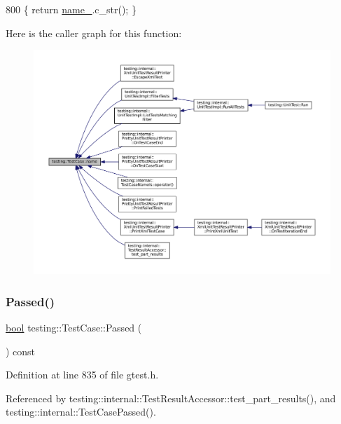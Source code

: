 \begin{DoxyCode}
800 \{ \textcolor{keywordflow}{return} \hyperlink{classtesting_1_1TestCase_a6c16e28e7555dc6a158415b3bfc4f833}{name\_}.c\_str(); \}
\end{DoxyCode}
Here is the caller graph for this function\+:
\nopagebreak
\begin{figure}[H]
\begin{center}
\leavevmode
\includegraphics[width=350pt]{classtesting_1_1TestCase_a3f1beb98d5f7e3b037a4ec82b64cc1cf_icgraph}
\end{center}
\end{figure}
\mbox{\label{classtesting_1_1TestCase_a29bbfd227b732a90198b5280c039c271}} 
\subsubsection{\texorpdfstring{Passed()}{Passed()}}
{\footnotesize\ttfamily \hyperlink{classbool}{bool} testing\+::\+Test\+Case\+::\+Passed (\begin{DoxyParamCaption}{ }\end{DoxyParamCaption}) const\hspace{0.3cm}{\ttfamily [inline]}}



Definition at line 835 of file gtest.\+h.



Referenced by testing\+::internal\+::\+Test\+Result\+Accessor\+::test\+\_\+part\+\_\+results(), and testing\+::internal\+::\+Test\+Case\+Passed().


